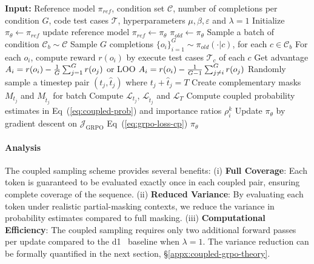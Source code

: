 \begin{algorithm}[t]
\caption{Coupled GRPO: Policy Optimization with Coupled Sampling}
\begin{algorithmic}[1]
\State \textbf{Input:} Reference model $\pi_{ref}$, condition set $\mathcal{C}$, number of completions per condition $G$, code test cases $\mathcal{T}$, hyperparameters $\mu,\beta,\varepsilon$ and $\lambda=1$
\State Initialize $\pi_{\theta} \gets \pi_{ref}$
    \State update reference model $\pi_{ref} \gets \pi_{\theta}$
    \State $\pi_{old} \gets \pi_{\theta}$
    \State Sample a batch of condition $\mathcal{C}_b \sim \mathcal{C}$
    \State Sample $G$ completions $\{o_i\}_{i=1}^G \sim \pi_{old}(\cdot|c)$, for each $c \in \mathcal C_b$
    \State For each $o_i$, compute reward $r(o_i)$ by execute test cases $\mathcal T_c$ of each $c$
    \State Get advantage $\small A_i=r(o_i)-\frac1G\sum_{j=1}^G r(o_j)$ or LOO $\small A_i=r(o_i)-\frac1{G-1}\sum_{j\neq i}^G r(o_j)$
            \State Randomly sample a timestep pair $(t_j, \hat{t}_j)$ where $t_j + \hat{t}_j = T$
            \State Create complementary masks $M_{t_j}$ and $M_{\hat{t}_j}$ for batch
            \State Compute $\mathcal{L}_{t_j}$, $\mathcal{L}_{\hat{t}_j}$ and $\mathcal{L}_{T}$
            \State Compute coupled probability estimates in Eq~(\ref{eq:coupled-prob}) and importance ratios $\rho_i^k$
        \State Update $\pi_{\theta}$ by gradient descent on $\mathcal{J}_{\text{GRPO}}$ Eq~(\ref{eq:grpo-loss-cp})
    \EndFor
    \EndFor
\EndWhile
\State \Return $\pi_{\theta}$
\end{algorithmic}
\label{algo:coupled-grpo}
\end{algorithm}

\paragraph{Analysis}
The coupled sampling scheme provides several benefits:
(i) \textbf{Full Coverage}: Each token is guaranteed to be evaluated exactly once in each coupled pair, ensuring complete coverage of the sequence.
(ii) \textbf{Reduced Variance}: By evaluating each token under realistic partial-masking contexts, we reduce the variance in probability estimates compared to full masking.
(iii) \textbf{Computational Efficiency}: The coupled sampling requires only two additional forward passes per update compared to the d1~\citep{zhao2025d1} baseline when $\lambda=1$.
The variance reduction can be formally quantified in the next section, \S\ref{appx:coupled-grpo-theory}. 

